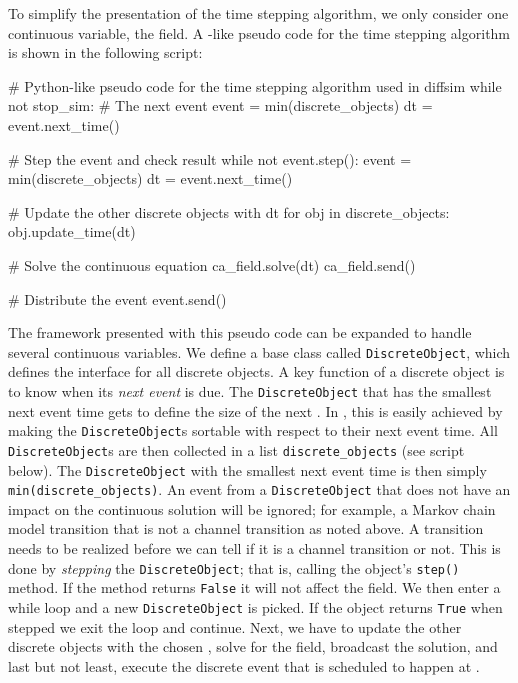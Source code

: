 To simplify the presentation of the time stepping algorithm, we only
consider one continuous variable, the \Ca field. A
-like pseudo code for the time stepping algorithm
is shown in the following script:
\begin{python}
# Python-like pseudo code for the time stepping algorithm used in diffsim
while not stop_sim:
    # The next event
    event = min(discrete_objects)
    dt = event.next_time()

    # Step the event and check result
    while not event.step():
        event = min(discrete_objects)
        dt = event.next_time()

    # Update the other discrete objects with dt
    for obj in discrete_objects:
        obj.update_time(dt)

    # Solve the continuous equation
    ca_field.solve(dt)
    ca_field.send()

    # Distribute the event
    event.send()
\end{python}
The framework presented with this pseudo code can be expanded to
handle several continuous variables. We define a base class called
\texttt{DiscreteObject}, which defines the interface for all discrete
objects. A key function of a discrete object is to know when its
\textit{next event} is due. The \texttt{DiscreteObject} that has the
smallest next event time gets to define the size of the next \Dt. In
, this is easily achieved by making the
\texttt{DiscreteObject}s sortable with respect to their next event
time. All \texttt{DiscreteObject}s are then collected in a list
\texttt{discrete\_objects} (see script below). The
\texttt{DiscreteObject} with the smallest next event time is then
simply \texttt{min(discrete\_objects)}. An event from a
\texttt{DiscreteObject} that does not have an impact on the continuous
solution will be ignored; for example, a Markov chain model transition
that is not a channel transition as noted above. A transition needs to
be realized before we can tell if it is a channel transition or
not. This is done by \textit{stepping} the \texttt{DiscreteObject};
that is, calling the object's \texttt{step()} method. If the method
returns \texttt{False} it will not affect the \Ca field. We then enter
a while loop and a new \texttt{DiscreteObject} is picked. If the
object returns \texttt{True} when stepped we exit the loop and
continue. Next, we have to update the other discrete objects with the
chosen \Dt, solve for the \Ca field, broadcast the solution, and last
but not least, execute the discrete event that is scheduled to happen
at \Dt.

